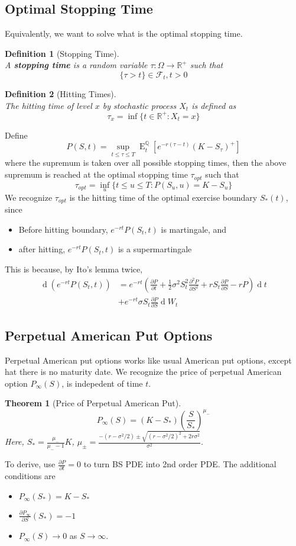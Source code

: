 \documentclass[12pt]{article}
\newtheorem{definition}{Definition}[section]
\newtheorem{theorem}{Theorem}[section]
\theoremstyle{definition}
\DeclareMathOperator{\diff}{d}
\DeclareMathOperator{\expec}{E}
\begin{document}
\subsection{Optimal Stopping Time}
Equivalently, we want to solve what is the optimal stopping time.
\begin{definition}[Stopping Time] 
\hfill\\\normalfont A \textbf{stopping time} is a random variable $\tau:\Omega\to\mathbb{R}^{+}$ such that
\[
\{\tau>t\}\in\mathcal{F}_t, t>0
\]
\end{definition}
\begin{definition}[Hitting Times]
\hfill\\\normalfont The hitting time of level $x$ by stochastic process $X_t$ is defined as
\[
\tau_x=\inf\{t\in\mathbb{R}^{+}: X_t=x\}
\]
\end{definition}
Define
\[
P(S,t)=\sup_{t\leq \tau\leq T}\expec_t^{\mathbb{Q}}[e^{-r(\tau-t)}(K-S_{\tau})^{+}]
\]
where the supremum is taken over all possible stopping times, then the above supremum is reached at the optimal stopping time $\tau_{opt}$ such that
\[
\tau_{opt}=\inf_u\{t\leq u\leq T: P(S_u, u)=K-S_u\}
\]
We recognize $\tau_{opt}$ is the hitting time of the optimal exercise boundary $S_\ast(t)$, since
\begin{itemize}
  \item Before hitting boundary, $e^{-rt}P(S_t,t)$ is martingale, and
  \item after hitting, $e^{-rt}P(S_t,t)$ is a supermartingale
\end{itemize}
This is because, by Ito's lemma twice,
\begin{align*}
\diff (e^{-rt}P(S_t,t))&=e^{-rt}(\frac{\partial P}{\partial t}+\frac{1}{2}\sigma^2 S_t^2\frac{\partial^2 P}{\partial S^2}+rS_t\frac{\partial P}{\partial S}-rP)\diff t\\
&+e^{-rt}\sigma S_t\frac{\partial P}{\partial S}\diff W_t
\end{align*}
\subsection{Perpetual American Put Options}
Perpetual American put options works like usual American put options, except hat there is no maturity date. We recognize the price of perpetual American option $P_\infty(S)$, is indepedent of time $t$.
\begin{theorem}[Price of Perpetual American Put]
\hfill\\\normalfont 
\[
P_\infty(S)=(K-S_{\ast})(\frac{S}{S_{\ast}})^{\mu_{-}}
\]
Here, $S_{\ast}=\frac{\mu_{-}}{\mu_{-}-1}K$, $\mu_{\pm}=\frac{-(r-\sigma^2/2)\pm\sqrt{(r-\sigma^2/2)^2+2r\sigma^2}}{\sigma^2}$.
\end{theorem}
To derive, use $\frac{\partial P}{\partial t}=0$ to turn BS PDE into 2nd order PDE. The additional conditions are
\begin{itemize}
  \item $P_{\infty}(S_{\ast})=K-S_{\ast}$
  \item $\frac{\partial P_{\infty}}{\partial S}(S_{\ast})=-1$
  \item $P_{\infty}(S)\to 0$ as $S\to \infty$.
\end{itemize}
\end{document}
